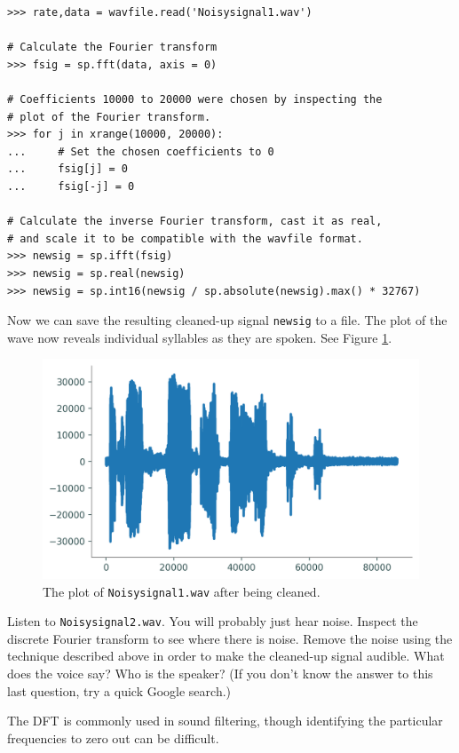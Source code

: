 \begin{lstlisting}
>>> rate,data = wavfile.read('Noisysignal1.wav')

# Calculate the Fourier transform
>>> fsig = sp.fft(data, axis = 0)

# Coefficients 10000 to 20000 were chosen by inspecting the
# plot of the Fourier transform.
>>> for j in xrange(10000, 20000):
...     # Set the chosen coefficients to 0
...     fsig[j] = 0
...     fsig[-j] = 0

# Calculate the inverse Fourier transform, cast it as real,
# and scale it to be compatible with the wavfile format.
>>> newsig = sp.ifft(fsig)
>>> newsig = sp.real(newsig)
>>> newsig = sp.int16(newsig / sp.absolute(newsig).max() * 32767)
\end{lstlisting}

Now we can save the resulting cleaned-up signal \texttt{newsig} to a  file.
The plot of the wave now reveals individual syllables as they are spoken.
See Figure \ref{fig:cleansignal}.

\begin{figure}[H]
    \centering
    \includegraphics[width=.7\textwidth]{figures/Cleanedsignal.png}
    \caption{The plot of \texttt{Noisysignal1.wav} after being cleaned.}
    \label{fig:cleansignal}
\end{figure}

\begin{problem} %
Listen to \texttt{Noisysignal2.wav}.
You will probably just hear noise.
Inspect the discrete Fourier transform to see where there is noise.
Remove the noise using the technique described above in order to make the cleaned-up signal audible.
What does the voice say?
Who is the speaker?
(If you don't know the answer to this last question, try a quick Google search.)
\end{problem}

The DFT is commonly used in sound filtering, though identifying the particular frequencies to zero out can be difficult.

